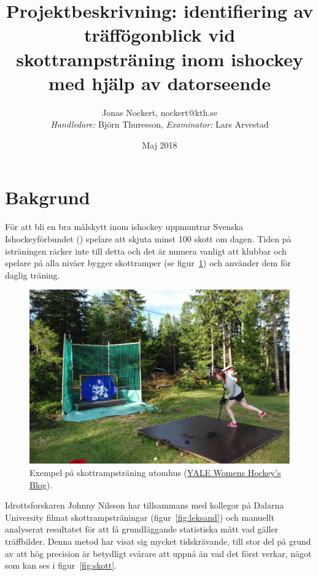 \documentclass[a4paper,12pt]{article}
\title{Projektbeskrivning: identifiering av träffögonblick vid
  skottrampsträning inom ishockey med hjälp av datorseende}
\author{Jonas Nockert, nockert@kth.se
  \\[0.5cm]{\small \textit{Handledare:} Björn Thuresson,
  \textit{Examinator:} Lars Arvestad}}
\date{Maj 2018}
\begin{document}
\maketitle

\section*{Bakgrund}
För att bli en bra målskytt inom ishockey uppmuntrar Svenska Ishockeyförbundet
(\citeyear{Swehockey:2016}) spelare att skjuta minst 100 skott om dagen. Tiden
på isträningen räcker inte till detta och det är numera vanligt att klubbar
och spelare på alla nivåer bygger skottramper (se figur~\ref{fig:skottramp})
och använder dem för daglig träning.

\begin{figure}[ht]
  \centering
  \includegraphics[width=\linewidth]{photos/the-incredible-shooting-ramp-my-mom-built-for-me.png}
  \caption{Exempel på skottrampsträning utomhus
  (\href{https://yalewomenshockey.wordpress.com/2013/07/18/ywih-summer-blog-hanna-astrom/}{YALE Womens Hockey's Blog}).
  \label{fig:skottramp}}
\end{figure}

Idrottsforskaren Johnny Nilsson har tillsammans med kollegor på Dalarna
University filmat skottrampsträningar (figur~\ref{fig:leksand}) och manuellt
analyserat resultatet för att få grundläggande statistiska mått vad gäller
träffbilder. Denna metod har visat sig mycket tidskrävande, till stor del
på grund av att hög precision är betydligt svårare att uppnå än vad det först
verkar, något som kan ses i figur~\ref{fig:skott}.
\end{document}
